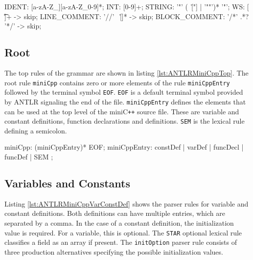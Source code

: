 \begin{AntlrCode}[float,numbers=none,caption=Terminal classes\texttt{,} whitespace and comments of the MiniC\texttt{++} ANTLR grammar., label=lst:ANTLRMiniCppTermClass]
IDENT:          [a-zA-Z_][a-zA-Z_0-9]*;
INT:            [0-9]+;
STRING:         '"' (~[\r\n"] | '""')* '"';
WS:             [ \t\n\r]+ -> skip;
LINE_COMMENT:   '//' ~[\r\n]* -> skip;
BLOCK_COMMENT:  '/*' .*? '*/' -> skip;
\end{AntlrCode}


\subsection{Root}

The top rules of the grammar are shown in listing \ref{lst:ANTLRMiniCppTop}. The root rule \texttt{miniCpp} contains zero or more elements of the rule \texttt{miniCppEntry} followed by the terminal symbol \texttt{EOF}. \texttt{EOF} is a default terminal symbol provided by ANTLR signaling the end of the file. \texttt{miniCppEntry} defines the elements that can be used at the top level of the miniC\verb|++| source file. These are variable and constant definitions, function declarations and definitions. \texttt{SEM} is the lexical rule defining a semicolon. 

\begin{AntlrCode}[float,numbers=none,caption=Top rules of the MiniC++ ANTLR grammar., label=lst:ANTLRMiniCppTop]
miniCpp:          (miniCppEntry)* EOF;
miniCppEntry:     constDef
                | varDef
                | funcDecl
                | funcDef
                | SEM
                ;
\end{AntlrCode}



\subsection{Variables and Constants}

Listing \ref{lst:ANTLRMiniCppVarConstDef} shows the parser rules for variable and constant definitions. Both definitions can have multiple entries, which are separated by a comma. In the case of a constant definition, the initialization value is required. For a variable, this is optional. The \texttt{STAR} optional lexical rule classifies a field as an array if present. The \texttt{initOption} parser rule consists of three production alternatives specifying the possible initialization values. 

